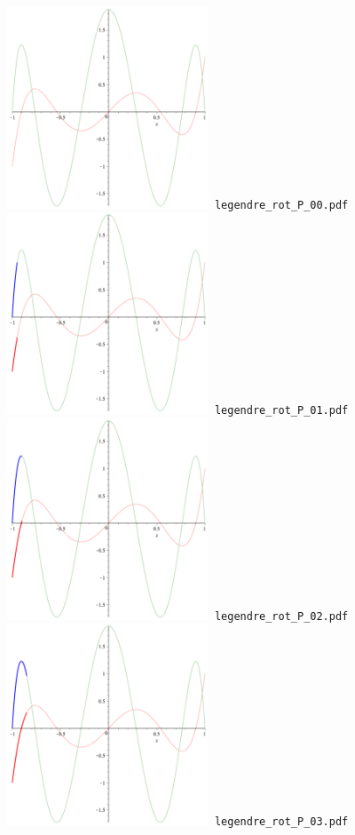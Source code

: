 \documentclass[a4paper]{amsart}
\begin{document}
\includegraphics[width=6cm]{legendre_rot_P_00.pdf}\verb+ legendre_rot_P_00.pdf+\\
\includegraphics[width=6cm]{legendre_rot_P_01.pdf}\verb+ legendre_rot_P_01.pdf+\\
\includegraphics[width=6cm]{legendre_rot_P_02.pdf}\verb+ legendre_rot_P_02.pdf+\\
\includegraphics[width=6cm]{legendre_rot_P_03.pdf}\verb+ legendre_rot_P_03.pdf+\\
\end{document}
